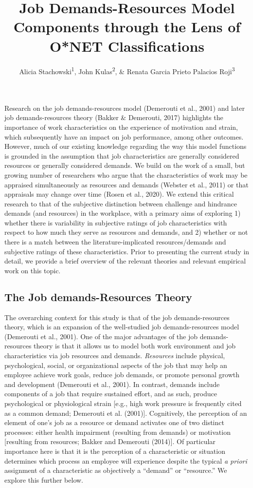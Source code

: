 \documentclass[
  english,
  man]{apa6}
\title{Job Demands-Resources Model Components through the Lens of O*NET Classifications}
\author{Alicia Stachowski\textsuperscript{1}, John Kulas\textsuperscript{2}, \& Renata Garcia Prieto Palacios Roji\textsuperscript{3}}
\date{}
\affiliation{\vspace{0.5cm}\textsuperscript{1} University of Wisconsin-Stout\\\textsuperscript{2} eRg\\\textsuperscript{3} PepsiCo}
\begin{document}
\maketitle

Research on the job demands-resources model (Demerouti et al., 2001) and later job demands-resources theory (Bakker \& Demerouti, 2017) highlights the importance of work characteristics on the experience of motivation and strain, which subsequently have an impact on job performance, among other outcomes. However, much of our existing knowledge regarding the way this model functions is grounded in the assumption that job characteristics are generally considered resources or generally considered demands. We build on the work of a small, but growing number of researchers who argue that the characteristics of work may be appraised simultaneously as resources and demands (Webster et al., 2011) or that appraisals may change over time (Rosen et al., 2020). We extend this critical research to that of the subjective distinction between challenge and hindrance demands (and resources) in the workplace, with a primary aims of exploring 1) whether there is variability in subjective ratings of job characteristics with respect to how much they serve as resources and demands, and 2) whether or not there is a match between the literature-implicated resources/demands and subjective ratings of these characteristics. Prior to presenting the current study in detail, we provide a brief overview of the relevant theories and relevant empirical work on this topic.

\hypertarget{the-job-demands-resources-theory}{%
\subsection{The Job demands-Resources Theory}\label{the-job-demands-resources-theory}}

The overarching context for this study is that of the job demands-resources theory, which is an expansion of the well-studied job demands-resources model (Demerouti et al., 2001). One of the major advantages of the job demands-resources theory is that it allows us to model both work environment and job characteristics via job resources and demands. \emph{Resources} include physical, psychological, social, or organizational aspects of the job that may help an employee achieve work goals, reduce job demands, or promote personal growth and development (Demerouti et al., 2001). In contrast, demands include components of a job that require sustained effort, and as such, produce psychological or physiological strain {[}e.g., high work pressure is frequently cited as a common demand; Demerouti et al. (2001){]}. Cognitively, the perception of an element of one's job as a resource or demand activates one of two distinct processes: either health impairment (resulting from demands) or motivation {[}resulting from resources; Bakker and Demerouti (2014){]}. Of particular importance here is that it is the perception of a characteristic or situation determines which process an employee will experience despite the typical \emph{a priori} assignment of a characteristic as objectively a ``demand'' or ``resource.'' We explore this further below.
\end{document}
